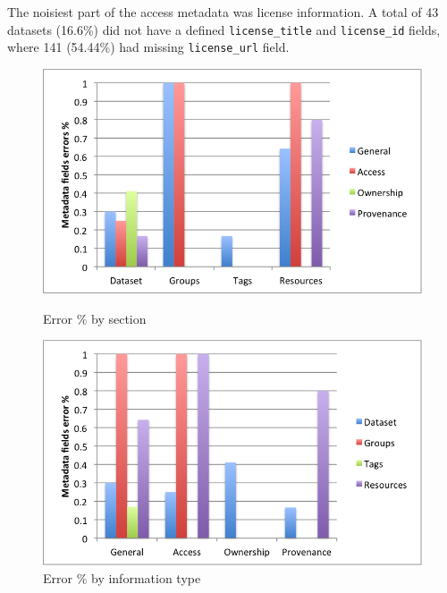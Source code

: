 \documentclass[runningheads,a4paper]{llncs}
\begin{document}
The noisiest part of the access metadata was license information. A total of 43 datasets (16.6\%) did not have a defined \texttt{license\_title} and \texttt{license\_id} fields, where 141 (54.44\%) had missing \texttt{license\_url} field.

\begin{figure}

\parbox{7cm}{\hspace*{-.2in}
\includegraphics[width=.95\linewidth]{metadata_noise_by_section.png}
\captionsetup{textfont=small,singlelinecheck=off,justification=centering}
\caption{Error \% by section}
\label{fig:2}}
\qquad
\begin{minipage}{7cm}\hspace*{-.6in}
\includegraphics[width=.95\linewidth]{metadata_noise_by_metadata_type.png}
\captionsetup{textfont=small,singlelinecheck=off,justification=raggedright}
\caption{Error \% by information type}
\label{fig:3}
\end{minipage}

\end{figure}
\end{document}
